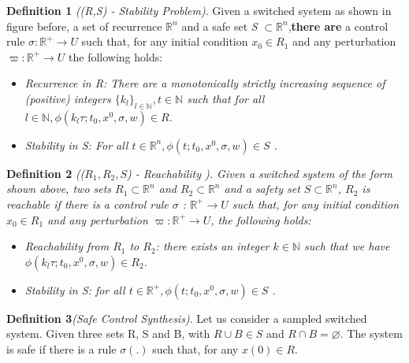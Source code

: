     \textbf{Definition 1} \emph{((R,S) - Stability Problem)}. Given a 
    switched system as shown in figure before, a set of recurrence 
    ${\mathbb{R}^n}$ and a safe set \emph{S}
    ${\subset \mathbb{R}^n}$,\textbf{there are} a control rule 
    ${\sigma : \mathbb{R}^+ \rightarrow U}$ such that, for any
    initial condition ${x_0  \in  R_1}$ and any perturbation 
    ${\varpi :\mathbb{R}^+\rightarrow U}$  the
    following holds:
    
    \begin{itemize}
        \item \emph{ Recurrence in \emph{R}: There are a monotonically 
        strictly increasing sequence of (positive) integers
        ${\lbrace k_l \rbrace_{l \in \mathbb{N}} , t \in \mathbb{N}}$ such 
        that for all ${ l \in \mathbb{N}, \phi(k_l\tau;t_0,x^0,\sigma,w) \in R }$.}
        \item \emph{ Stability in \emph{S}: For all ${ t \in \mathbb{R}^n,
        \phi(t;t_0,x^0,\sigma,w) \in S}$ .}
    \end{itemize}
    
    \textbf{Definition 2} \emph{((${R_1,R_2,S}$) - Reachability ). %
        Given a switched system of the form shown above, two sets  
        ${ R_1 \subset \mathbb{R}^n}$  and ${ R_2 \subset \mathbb{R}^n}$ 
        and a safety set  ${S \subset  \mathbb{R}^n}$, $R_2$ is reachable if
        there is a control rule  ${\sigma}$ :
        ${\mathbb{R}^+\rightarrow U}$ such that, for any initial condition 
        ${x_0  \in  R_1}$ and any perturbation  ${\varpi : \mathbb{R}^+  
        \rightarrow U}$, the following holds:}
    
    \begin{itemize}
        \item  \emph{Reachability from ${R_1}$ to ${R_2}$: there exists 
        an integer ${k \in \mathbb{N} }$ such that we have ${ \phi( k_l\tau
        ;t_0,x^0,\sigma,w) \in R_2 }$.}
        \item \emph{ Stability in S: for all ${ t \in \mathbb{R}^+, 
        \phi(t;t_0,x^0,\sigma,w) \in S}$ .}
    \end{itemize}
    
    \textbf{Definition 3}\emph{(Safe Control Synthesis)}. Let us 
    consider a sampled switched system. Given three sets R, S and B, 
    with ${R \cup B \in S}$  and ${R \cap B = \varnothing }$. %
    The system is safe if there is a rule ${\sigma(.)}$ such that, 
    for any ${x(0) \in R }$. 

